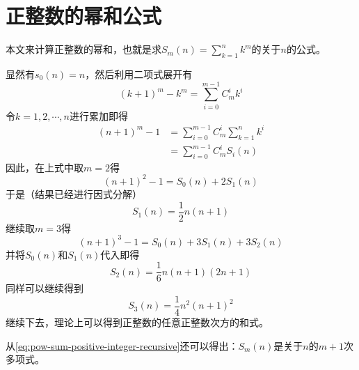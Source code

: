 
\section{正整数的幂和公式}
\label{sec:power-sum-for-positive-integer}

本文来计算正整数的幂和，也就是求$S_m(n) = \sum_{k=1}^nk^m$的关于$n$的公式。

显然有$s_0(n)=n$，然后利用二项式展开有
\begin{equation*}
(k+1)^{m}-k^{m} = \sum_{i=0}^{m-1}C_{m}^{i}k^i
\end{equation*}
令$k=1,2,\cdots,n$进行累加即得
\begin{equation}
\begin{split}
  \label{eq:pow-sum-positive-integer-recursive}
(n+1)^{m}-1 & = \sum_{i=0}^{m-1}C_{m}^{i}\sum_{k=1}^{n}k^i \\
             & = \sum_{i=0}^{m-1}C_{m}^{i}S_i(n)
\end{split}
\end{equation}
因此，在上式中取$m=2$得
\begin{equation*}
(n+1)^2-1 = S_0(n)+2S_1(n)
\end{equation*}
于是（结果已经进行因式分解）
\begin{equation*}
S_1(n)=\frac{1}{2}n(n+1)
\end{equation*}
继续取$m=3$得
\begin{equation*}
(n+1)^3-1=S_0(n)+3S_1(n)+3S_2(n)
\end{equation*}
并将$S_0(n)$和$S_1(n)$代入即得
\begin{equation*}
S_2(n) = \frac{1}{6}n(n+1)(2n+1)
\end{equation*}
同样可以继续得到
\begin{equation*}
S_3(n)=\frac{1}{4}n^2(n+1)^2
\end{equation*}
继续下去，理论上可以得到正整数的任意正整数次方的和式。

从\ref{eq:pow-sum-positive-integer-recursive}还可以得出：$S_m(n)$是关于$n$的$m+1$次多项式。

